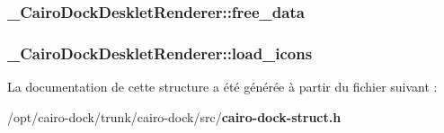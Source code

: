 \subsubsection{ {\bf \_\-CairoDockDeskletRenderer::free\_\-data}}\label{struct__CairoDockDeskletRenderer_c14c9b69ad164e5833ed54417eee546e}


\subsubsection{ {\bf \_\-CairoDockDeskletRenderer::load\_\-icons}}\label{struct__CairoDockDeskletRenderer_9953725c1a47e779bcf4bc7476c2baac}




La documentation de cette structure a été générée à partir du fichier suivant :\begin{CompactItemize}
\item 
/opt/cairo-dock/trunk/cairo-dock/src/{\bf cairo-dock-struct.h}\end{CompactItemize}
